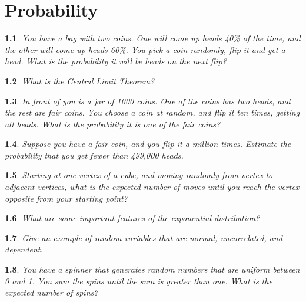 \documentclass{report}
\newtheorem{problem}{}
\numberwithin{problem}{chapter} %
\begin{document}
\chapter{Probability}

\begin{problem}
You have a bag with two coins. One will come up heads 40\% of the time, and the other will come up heads 60\%. You pick a coin randomly, flip it and get a head. What is the probability it will be heads on the next flip?
\end{problem}

\begin{problem}
What is the Central Limit Theorem?
\end{problem}

\begin{problem}
In front of you is a jar of 1000 coins. One of the coins has two heads, and the rest are fair coins. You choose a coin at random, and flip it ten times, getting all heads. What is the probability it is one of the fair coins?
\end{problem}

\begin{problem}
Suppose you have a fair coin, and you flip it a million times. Estimate the probability that you get fewer than 499,000 heads.
\end{problem}

\begin{problem}
\cite{STRAWA}
Starting at one vertex of a cube, and moving randomly from vertex to adjacent vertices, what is the expected number of moves until you reach the  vertex opposite from your starting point?
\end{problem}

\begin{problem}
What are some important features of the exponential distribution?
\end{problem}

\begin{problem}
Give an example of random variables that are normal, uncorrelated, and dependent.
\end{problem}

\begin{problem}
You have a spinner that generates random numbers that are uniform between 0 and 1. You sum the spins until the sum is greater than one. What is the expected number of spins?
\end{problem}
\end{document}
